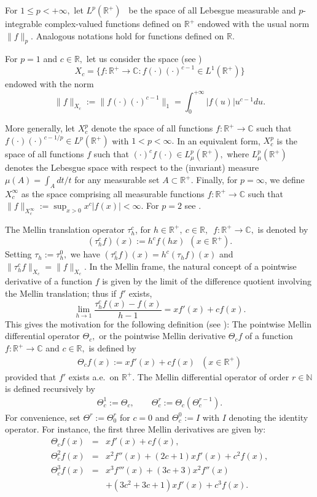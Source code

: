 \documentclass[amsmath,english,a4paper,graphicx,12pt]{article}
\begin{document}
For $1\leq p < +\infty,$ let $L^p(\mathbb{R}^+)$~ be the space of all Lebesgue measurable and $p$-integrable complex-valued functions defined on 
$\mathbb{R}^+$ endowed with the usual norm $\|f\|_p.$ Analogous notations hold for functions 
defined on $\mathbb{R}.$

For $p=1$ and $c \in \mathbb{R},$ let us consider the space (see \cite{BJ2})
$$X_c = \{ f: \mathbb{R}^+\rightarrow \mathbb{C}: f(\cdot) (\cdot)^{c-1}\in L^1(\mathbb{R}^+) \}$$
endowed with the norm
$$ \| f\|_{X_c} := \|f(\cdot) (\cdot)^{c-1} \|_1 = \int_0^{+\infty} |f(u)|u^{c-1} du.$$

More generally, let $X^p_c$  denote the space of all  functions $f: \mathbb{R}^+\rightarrow \mathbb{C}$ such that 
$f(\cdot) (\cdot)^{c-1/p}\in L^p (\mathbb{R}^+)$ with $1<p< \infty.$ In an equivalent form, $X^p_c$ is the space of all functions $f$ such that 
$(\cdot)^c f(\cdot) \in L^p_\mu(\mathbb{R}^+),$ where $ L^p_\mu(\mathbb{R}^+)$ denotes the Lebesgue space with respect to the (invariant) measure 
$\mu (A) = \int_A dt/t$ for  any measurable set $A \subset \mathbb{R}^+.$ Finally, for $p=\infty$, we define $X^\infty_c$ as the space comprising 
all measurable functions $f : \mathbb{R}^+\rightarrow \mathbb{C}$ such that $\|f\|_{X^\infty_c}:= \sup_{x>0}x^{c}|f(x)| < \infty.$ For $p=2$ see \cite{BJ4}.

 The Mellin translation operator $\tau_h^c$, for $h \in \mathbb{R}^+,~c \in \mathbb{R},$~$f: \mathbb{R}^+ \rightarrow \mathbb{C},$ is denoted by
$$(\tau_h^c f)(x) := h^c f(hx)~~(x\in \mathbb{R}^+).$$
Setting $\tau_h:= \tau^0_h,$ we have $(\tau_h^cf)(x) = h^c (\tau_hf)(x)$ and  $\|\tau_h^c f\|_{X_c} = \|f\|_{X_c}.$
\vskip0.3cm
In the Mellin frame, the natural concept of a  pointwise derivative of a function $f$ is given by the limit of the difference quotient involving 
the Mellin translation; thus if $f'$ exists,
$$\lim_{h \rightarrow 1}\frac{\tau_h^cf(x) - f(x)}{h-1} =  x f'(x) + cf(x).$$
This gives the motivation for the following definition (see \cite{BJ2}):
The pointwise Mellin differential operator $\Theta_c,$ or the pointwise Mellin derivative $\Theta_cf$ of a function 
$f: \mathbb{R}^+ \rightarrow \mathbb{C}$ and $c \in \mathbb{R},$ is defined by
\begin{eqnarray*}
\Theta_cf(x) := x f'(x) + c f(x)~~~(x \in \mathbb{R}^+)
\end{eqnarray*}
provided that $f'$ exists a.e.\ on $\mathbb{R}^+.$ The Mellin differential operator of order $r \in \mathbb{N}$ is defined recursively by
\begin{eqnarray*}
\Theta^1_c := \Theta_c ,\quad\quad \Theta^r_c := \Theta_c (\Theta_c^{r-1}).
\end{eqnarray*}
For convenience, set $\Theta^r:= \Theta^r_0$ for $c=0$ and $\Theta_c^0 := I$ with $I$ denoting the identity operator.
For instance, the first three Mellin derivatives are given by:
\begin{eqnarray*}
\Theta_cf(x) &=& xf'(x) + cf(x),\\
\Theta^2_cf(x) &=& x^2 f''(x) + (2c+1) xf'(x) + c^2f(x),\\
\Theta^3_cf(x) &= &x^3 f'''(x) + (3c+3)x^2f''(x) \\&& +(3c^2 + 3c +1)xf'(x) + c^3 f(x).
\end{eqnarray*}
\end{document}
